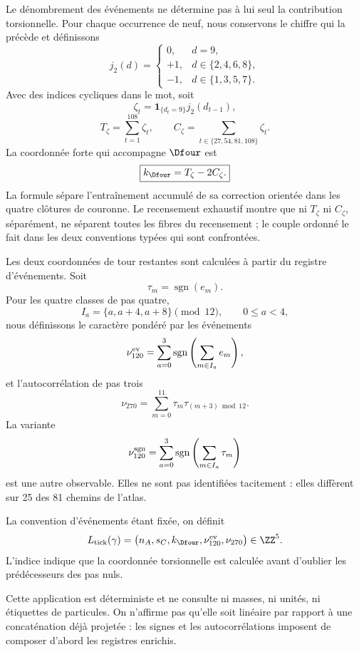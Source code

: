 Le dénombrement des événements ne détermine pas à lui seul la contribution torsionnelle. Pour
chaque occurrence de neuf, nous conservons le chiffre qui la précède et définissons
\[
 j_2(d)=
 \begin{cases}
 0,&d=9,\\
 +1,&d\in\{2,4,6,8\},\\
 -1,&d\in\{1,3,5,7\}.
 \end{cases}
\]
Avec des indices cycliques dans le mot, soit
\[
 \zeta_t=\mathbf 1_{\{d_t=9\}}j_2(d_{t-1}),
\]
\[
 T_\zeta=\sum_{t=1}^{108}\zeta_t,
 \qquad
 C_\zeta=\sum_{t\in\{27,54,81,108\}}\zeta_t.
\]
La coordonnée forte qui accompagne \(\Dfour\) est
\[
 \boxed{k_{\Dfour}=T_\zeta-2C_\zeta.}
\]
La formule sépare l'entraînement accumulé de sa correction orientée dans les
quatre clôtures de couronne. Le recensement exhaustif montre que ni
\(T_\zeta\) ni \(C_\zeta\), séparément, ne séparent toutes les fibres du recensement ;
le couple ordonné le fait dans les deux conventions typées qui sont confrontées.

Les deux coordonnées de tour restantes sont calculées à partir du registre
d'événements. Soit
\[
 \tau_m=\operatorname{sgn}(e_m).
\]
Pour les quatre classes de pas quatre,
\[
 I_a=\{a,a+4,a+8\}\pmod{12},
 \qquad 0\leq a<4,
\]
nous définissons le caractère pondéré par les événements
\[
 \nu_{120}^{\rm ev}
 =\sum_{a=0}^{3}\operatorname{sgn}
 \left(\sum_{m\in I_a}e_m\right),
\]
et l'autocorrélation de pas trois
\[
 \nu_{270}=\sum_{m=0}^{11}\tau_m\tau_{(m+3)\bmod12}.
\]
La variante
\[
 \nu_{120}^{\rm sgn}
 =\sum_{a=0}^{3}\operatorname{sgn}
 \left(\sum_{m\in I_a}\tau_m\right)
\]
est une autre observable. Elles ne sont pas identifiées tacitement : elles diffèrent sur
25 des 81 chemins de l'atlas.

\begin{definition}
La convention d'événements étant fixée, on définit
\[
 L_{\rm tick}(\gamma)=
 \bigl(n_A,s_C,k_{\Dfour},\nu_{120}^{\rm ev},\nu_{270}\bigr)
 \in\ZZ^5.
\]
L'indice indique que la coordonnée torsionnelle est calculée avant d'oublier
les prédécesseurs des pas nuls.
\end{definition}

Cette application est déterministe et ne consulte ni masses, ni unités, ni étiquettes
de particules. On n'affirme pas qu'elle soit linéaire par rapport à une concaténation déjà
projetée : les signes et les autocorrélations imposent de composer d'abord les
registres enrichis.
